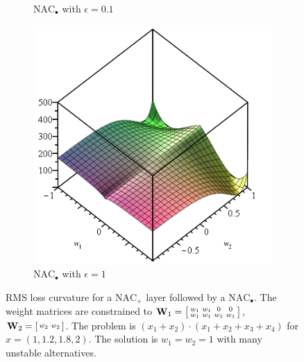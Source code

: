 \begin{figure}[h]
\begin{subfigure}{.33\textwidth}
  \caption{$\mathrm{NAC}_{\bullet}$ with $\epsilon = 0.1$}
\end{subfigure}
\begin{subfigure}{.33\textwidth}
  \centering
  \includegraphics[width=\linewidth,trim={0 0 0 4.35cm},clip]{graphics/nac-mul-eps-1.png}
  \caption{$\mathrm{NAC}_{\bullet}$ with $\epsilon = 1$}
\end{subfigure}

\caption{RMS loss curvature for a $\mathrm{NAC}_{+}$ layer followed by a $\mathrm{NAC}_{\bullet}$. The weight matrices are constrained to $\mathbf{W}_1 = \left[\protect\begin{smallmatrix}
w_1 & w_1 & 0 & 0 \\
w_1 & w_1 & w_1 & w_1
\protect\end{smallmatrix}\right]$, $\mathbf{W}_2 = \left[\protect\begin{smallmatrix}
w_2 & w_2
\protect\end{smallmatrix}\right]$. The problem is $(x_1 + x_2) \cdot (x_1 + x_2 + x_3 + x_4)$ for $x = \left(1, 1.2, 1.8, 2\right)$.
The solution is $w_1 = w_2 = 1$ with many unstable alternatives.}
\label{fig:nac-mul-eps-issue}
\end{figure}

